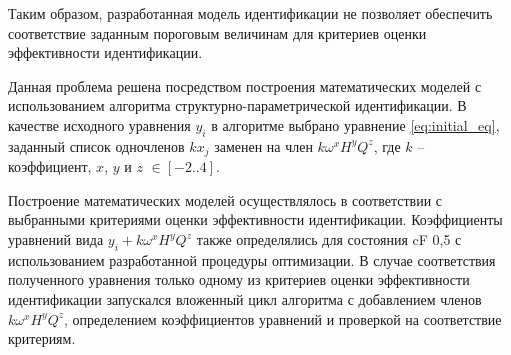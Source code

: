 Таким образом, разработанная модель идентификации не позволяет обеспечить соответствие заданным пороговым величинам для критериев оценки эффективности идентификации.


Данная проблема решена посредством построения математических моделей с использованием алгоритма структурно-параметрической идентификации. В качестве исходного уравнения $y_i$ в алгоритме выбрано уравнение \eqref{eq:initial_eq}, заданный список одночленов $kx_j$ заменен на член $k\omega^xH^yQ^z$, где $k$ -- коэффициент, $x$, $y$ и $z$ $\in [-2 .. 4].$ %

Построение математических моделей осуществлялось в соответствии с выбранными критериями оценки эффективности идентификации. Коэффициенты уравнений вида $y_i + k\omega^xH^yQ^z$ также определялись для состояния cF 0,5 с использованием разработанной процедуры оптимизации. В случае соответствия полученного уравнения только одному из критериев оценки эффективности идентификации запускался вложенный цикл алгоритма с добавлением членов $k\omega^xH^yQ^z$, определением коэффициентов уравнений и проверкой на соответствие критериям.


